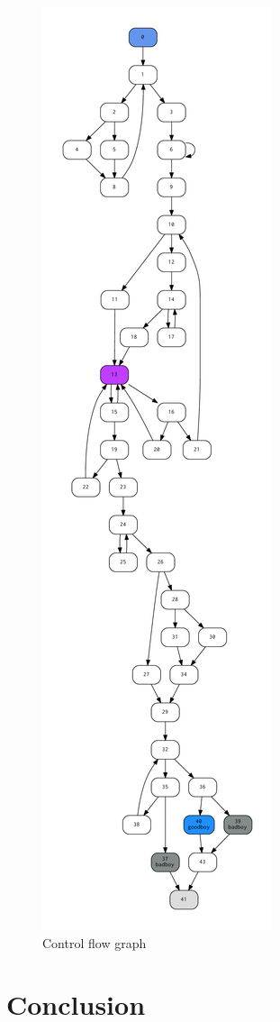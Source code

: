 \documentclass{easychair}
\begin{document}
\begin{figure}[ht]
  \centering
  \includegraphics[height=1\textheight,keepaspectratio]{panda_cfg.pdf}
  \caption{Control flow graph}\label{fig:cfg}
\end{figure}

\section{Conclusion}

\printbibliography
\end{document}
